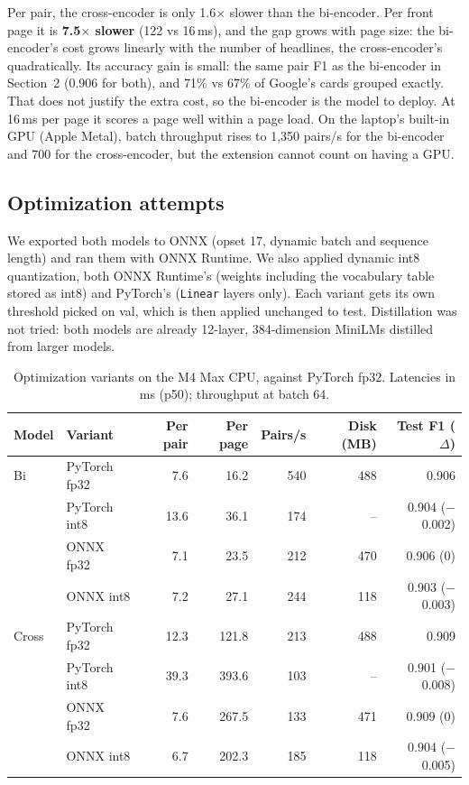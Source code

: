Per pair, the cross-encoder is only 1.6$\times$ slower than the bi-encoder. Per front page it is \textbf{7.5$\times$ slower} (122 vs 16\,ms), and the gap grows with page size: the bi-encoder's cost grows linearly with the number of headlines, the cross-encoder's quadratically. Its accuracy gain is small: the same pair F1 as the bi-encoder in Section~2 (0.906 for both), and 71\% vs 67\% of Google's cards grouped exactly. That does not justify the extra cost, so the bi-encoder is the model to deploy. At 16\,ms per page it scores a page well within a page load. On the laptop's built-in GPU (Apple Metal), batch throughput rises to 1,350 pairs/s for the bi-encoder and 700 for the cross-encoder, but the extension cannot count on having a GPU.

\subsection{Optimization attempts}

We exported both models to ONNX (opset 17, dynamic batch and sequence length) and ran them with ONNX Runtime. We also applied dynamic int8 quantization, both ONNX Runtime's (weights including the vocabulary table stored as int8) and PyTorch's (\texttt{Linear} layers only). Each variant gets its own threshold picked on val, which is then applied unchanged to test. Distillation was not tried: both models are already 12-layer, 384-dimension MiniLMs distilled from larger models.

\begin{table}[H]
\centering
\caption{Optimization variants on the M4 Max CPU, against PyTorch fp32. Latencies in ms (p50); throughput at batch 64.}
\label{tab:optim}
\small
\begin{tabular}{@{}llrrrrr@{}}
\toprule
Model & Variant & Per pair & Per page & Pairs/s & Disk (MB) & Test F1 ($\Delta$) \\
\midrule
Bi & PyTorch fp32 & 7.6 & 16.2 & 540 & 488 & 0.906 \\
   & PyTorch int8 & 13.6 & 36.1 & 174 & -- & 0.904 ($-$0.002) \\
   & ONNX fp32 & 7.1 & 23.5 & 212 & 470 & 0.906 (0) \\
   & ONNX int8 & 7.2 & 27.1 & 244 & 118 & 0.903 ($-$0.003) \\
\midrule
Cross & PyTorch fp32 & 12.3 & 121.8 & 213 & 488 & 0.909 \\
      & PyTorch int8 & 39.3 & 393.6 & 103 & -- & 0.901 ($-$0.008) \\
      & ONNX fp32 & 7.6 & 267.5 & 133 & 471 & 0.909 (0) \\
      & ONNX int8 & 6.7 & 202.3 & 185 & 118 & 0.904 ($-$0.005) \\
\bottomrule
\end{tabular}
\end{table}

